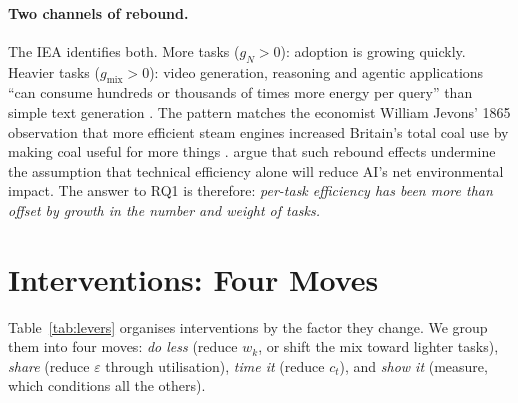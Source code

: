 \documentclass[11pt]{article}
\theoremstyle{definition}
\theoremstyle{remark}
\begin{document}
\paragraph{Two channels of rebound.} The IEA identifies both. More tasks ($g_N>0$): adoption is growing quickly. Heavier tasks ($g_{\text{mix}}>0$): video generation, reasoning and agentic applications ``can consume hundreds or thousands of times more energy per query'' than simple text generation \citep{iea2026}. The pattern matches the economist William Jevons' 1865 observation that more efficient steam engines increased Britain's total coal use by making coal useful for more things \citep{jevons1865}. \citet{luccioni2025jevons} argue that such rebound effects undermine the assumption that technical efficiency alone will reduce AI's net environmental impact. The answer to RQ1 is therefore: \emph{per-task efficiency has been more than offset by growth in the number and weight of tasks.}

\section{Interventions: Four Moves}\label{sec:moves}

Table~\ref{tab:levers} organises interventions by the factor they change. We group them into four moves: \emph{do less} (reduce $w_k$, or shift the mix toward lighter tasks), \emph{share} (reduce $\varepsilon$ through utilisation), \emph{time it} (reduce $c_t$), and \emph{show it} (measure, which conditions all the others).
\end{document}
